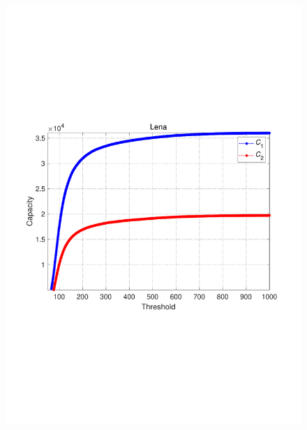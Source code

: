 \documentclass[review,3p,10pt,sort&compress]{elsarticle}
\begin{document}
\begin{figure}
{\begin{minipage}[t]{0.31\linewidth}
    \includegraphics[width=1\textwidth]{figures/CapLena.pdf}
    \end{minipage}
}
\end{figure}
\end{document}
